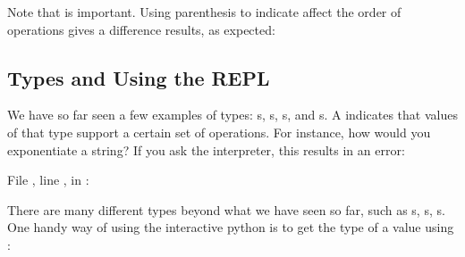 Note that  is important.  Using parenthesis to
indicate affect the order of operations gives a difference results, as
expected:

\begin{sphinxVerbatim}[commandchars=\\\{\}]
        
        
          
\end{sphinxVerbatim}


\subsection{Types and Using the REPL}
\label{\detokenize{lesson/prg/python_intro:types-and-using-the-repl}}
We have so far seen a few examples of types: s, s,
s, and s.  A  indicates that values of that
type support a certain set of operations. For instance, how would you
exponentiate a string? If you ask the interpreter, this results in an
error:

\begin{sphinxVerbatim}[commandchars=\\\{\}]
  File , line , in 
: 
\end{sphinxVerbatim}

There are many different types beyond what we have seen so far, such
as s, s, s. One handy way of using
the interactive python is to get the type of a value using :

